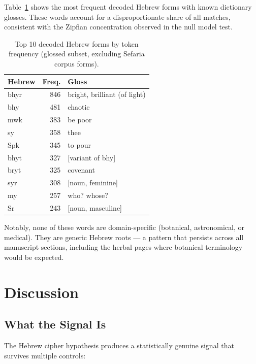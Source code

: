\documentclass[11pt,a4paper]{article}
\newcommand{\heb}[1]{\textsf{#1}}
\begin{document}
Table~\ref{tab:topwords} shows the most frequent decoded Hebrew forms with
known dictionary glosses. These words account for a disproportionate share
of all matches, consistent with the Zipfian concentration observed in the
null model test.

\begin{table}[htbp]
\centering
\caption{Top 10 decoded Hebrew forms by token frequency (glossed subset,
excluding Sefaria corpus forms).}
\label{tab:topwords}
\small
\begin{tabular}{@{}lrl@{}}
\toprule
Hebrew & Freq. & Gloss \\
\midrule
\heb{bhyr} & 846 & bright, brilliant (of light) \\
\heb{bhy} & 481 & chaotic \\
\heb{mwk} & 383 & be poor \\
\heb{sy} & 358 & thee \\
\heb{Spk} & 345 & to pour \\
\heb{bhyt} & 327 & [variant of \heb{bhy}] \\
\heb{bryt} & 325 & covenant \\
\heb{syr} & 308 & [noun, feminine] \\
\heb{my} & 257 & who? whose? \\
\heb{Sr} & 243 & [noun, masculine] \\
\bottomrule
\end{tabular}
\end{table}

Notably, none of these words are domain-specific (botanical, astronomical,
or medical). They are generic Hebrew roots --- a pattern that persists across
all manuscript sections, including the herbal pages where botanical
terminology would be expected.


\section{Discussion}
\label{sec:discussion}

\subsection{What the Signal Is}

The Hebrew cipher hypothesis produces a statistically genuine signal that
survives multiple controls:
\end{document}
